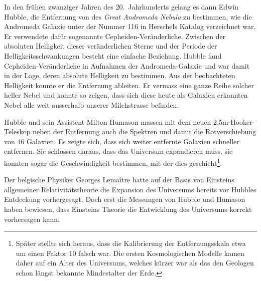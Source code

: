 In den frühen zwanziger Jahren des 20.~Jahrhunderts gelang es dann
Edwin Hubble, die Entfernung von des {\em Great Andromeda Nebula}
%
zu bestimmen, wie
die Andromeda Galaxie unter der Nummer 116 in Herschels Katalog verzeichnet
war.
Er verwendete dafür sogenannte Cepheiden-Veränderliche.
Zwischen der absoluten Helligkeit dieser veränderlichen
Sterne und der Periode der Helligkeitsschwankungen besteht
eine einfache Beziehung.
Hubble fand Cepheiden-Veränderliche in Aufnahmen der Andromeda-Galaxie
und war damit in der Lage, deren absolute Helligkeit zu bestimmen.
Aus der beobachteten Helligkeit konnte er die Entfernung ableiten.
Er vermass eine ganze Reihe solcher heller Nebel und konnte so zeigen,
dass sich diese heute als Galaxien erkannten Nebel alle
weit ausserhalb unserer Milchstrasse
befinden.

Hubble und sein Assistent Milton Humason massen mit dem neuen
%
2.5m-Hooker-Teleskop neben der Entfernung auch die Spektren und
%
damit die Rotverschiebung von 46 Galaxien.
Es zeigte sich, dass sich weiter entfernte Galaxien schneller 
entfernen.
Sie schlossen daraus, dass das Universum expandieren muss, sie konnten
sogar die Geschwindigkeit bestimmen, mit der dies geschieht\footnote{
Später stellte sich heraus, dass die Kalibrierung der Entfernungsskala
etwa um einen Faktor 10 falsch war. Die ersten Kosmologischen Modelle
kamen daher auf ein Alter des Universums, welches kürzer war als das
den Geologen schon längst bekannte Mindestalter der Erde.}.

Der belgische Physiker
Georges Lemaître hatte auf der Basis von Einsteins allgemeiner
%
Relativitätstheorie die Expansion des Universums bereits vor
Hubbles Entdeckung vorhergesagt.
Doch erst die Messungen von Hubble und Humason haben bewiesen,
dass Einsteins Theorie die Entwicklung des Universums korrekt
vorhersagen kann.

